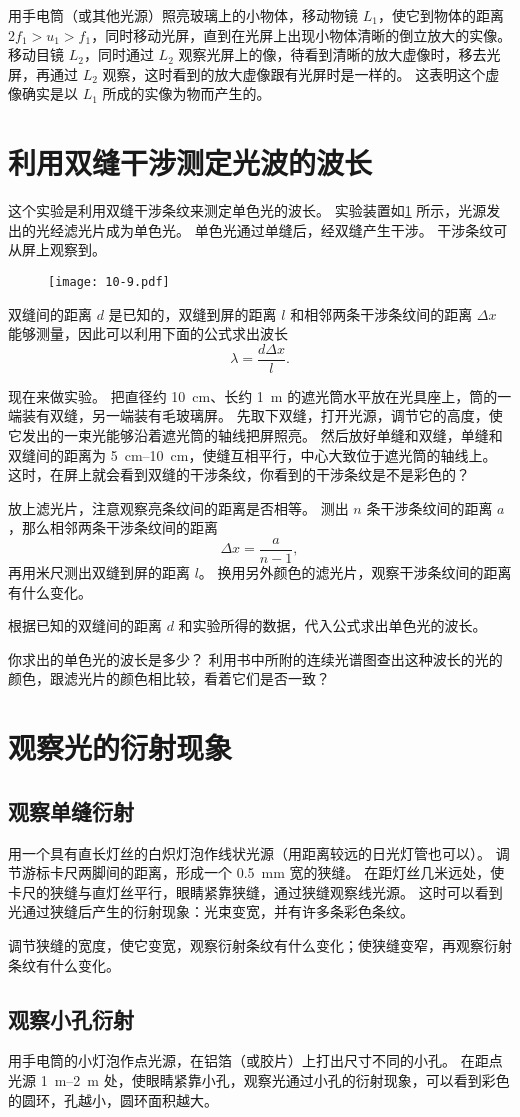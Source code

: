 用手电筒（或其他光源）照亮玻璃上的小物体，移动物镜 $L_1$，使它到物体的距离 $2f_1>u_1>f_1$，同时移动光屏，直到在光屏上出现小物体清晰的倒立放大的实像。
移动目镜 $L_2$，同时通过 $L_2$ 观察光屏上的像，待看到清晰的放大虚像时，移去光屏，再通过 $L_2$ 观察，这时看到的放大虚像跟有光屏时是一样的。
这表明这个虚像确实是以 $L_1$ 所成的实像为物而产生的。

\section{利用双缝干涉测定光波的波长}
这个实验是利用双缝干涉条纹来测定单色光的波长。
实验装置如\cref{fig:10-9} 所示，光源发出的光经滤光片成为单色光。
单色光通过单缝后，经双缝产生干涉。
干涉条纹可从屏上观察到。
\begin{figure}
  \texttt{[image: 10-9.pdf]}
  \caption{}\label{fig:10-9}
\end{figure}

双缝间的距离 $d$ 是已知的，双缝到屏的距离 $l$ 和相邻两条干涉条纹间的距离 $\Delta x$ 能够测量，因此可以利用下面的公式求出波长
\[\lambda=\frac{d\Delta x}{l}.\]

现在来做实验。
把直径约 \qty{10}{cm}、长约 \qty{1}{m} 的遮光筒水平放在光具座上，筒的一端装有双缝，另一端装有毛玻璃屏。
先取下双缝，打开光源，调节它的高度，使它发出的一束光能够沿着遮光筒的轴线把屏照亮。
然后放好单缝和双缝，单缝和双缝间的距离为 \qtyrange{5}{10}{cm}，使缝互相平行，中心大致位于遮光筒的轴线上。
这时，在屏上就会看到双缝的干涉条纹，你看到的干涉条纹是不是彩色的？

放上滤光片，注意观察亮条纹间的距离是否相等。
测出 $n$ 条干涉条纹间的距离 $a$，那么相邻两条干涉条纹间的距离
\[\Delta x=\frac{a}{n-1},\]
再用米尺测出双缝到屏的距离 $l$。
换用另外颜色的滤光片，观察干涉条纹间的距离有什么变化。

根据已知的双缝间的距离 $d$ 和实验所得的数据，代入公式求出单色光的波长。

你求出的单色光的波长是多少？
利用书中所附的连续光谱图查出这种波长的光的颜色，跟滤光片的颜色相比较，看着它们是否一致？

\section{观察光的衍射现象}
\subsection{观察单缝衍射}
用一个具有直长灯丝的白炽灯泡作线状光源（用距离较远的日光灯管也可以）。
调节游标卡尺两脚间的距离，形成一个 \qty{0.5}{mm} 宽的狭缝。
在距灯丝几米远处，使卡尺的狭缝与直灯丝平行，眼睛紧靠狭缝，通过狭缝观察线光源。
这时可以看到光通过狭缝后产生的衍射现象：光束变宽，并有许多条彩色条纹。

调节狭缝的宽度，使它变宽，观察衍射条纹有什么变化；使狭缝变窄，再观察衍射条纹有什么变化。

\subsection{观察小孔衍射}
用手电筒的小灯泡作点光源，在铝箔（或胶片）上打出尺寸不同的小孔。
在距点光源 \qtyrange{1}{2}{m} 处，使眼睛紧靠小孔，观察光通过小孔的衍射现象，可以看到彩色的圆环，孔越小，圆环面积越大。
